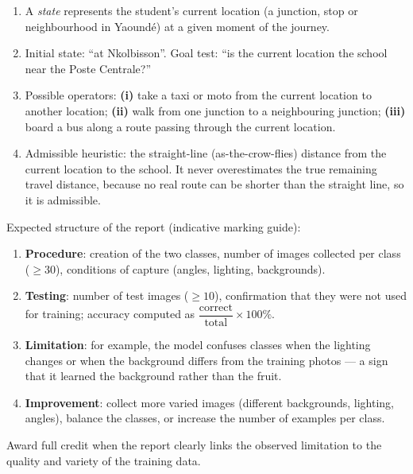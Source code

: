 \documentclass[11pt]{article}
\begin{document}
\begin{corrige}
\begin{enumerate}
\item A \emph{state} represents the student's current location (a junction, stop or neighbourhood in Yaoundé) at a given moment of the journey.
\item Initial state: ``at Nkolbisson''. Goal test: ``is the current location the school near the Poste Centrale?''
\item Possible operators: \textbf{(i)} take a taxi or moto from the current location to another location; \textbf{(ii)} walk from one junction to a neighbouring junction; \textbf{(iii)} board a bus along a route passing through the current location.
\item Admissible heuristic: the straight-line (as-the-crow-flies) distance from the current location to the school. It never overestimates the true remaining travel distance, because no real route can be shorter than the straight line, so it is admissible.
\end{enumerate}
\end{corrige}

\begin{corrige}
Expected structure of the report (indicative marking guide):
\begin{enumerate}
\item \textbf{Procedure}: creation of the two classes, number of images collected per class ($\geq 30$), conditions of capture (angles, lighting, backgrounds).
\item \textbf{Testing}: number of test images ($\geq 10$), confirmation that they were not used for training; accuracy computed as $\dfrac{\text{correct}}{\text{total}} \times 100\%$.
\item \textbf{Limitation}: for example, the model confuses classes when the lighting changes or when the background differs from the training photos --- a sign that it learned the background rather than the fruit.
\item \textbf{Improvement}: collect more varied images (different backgrounds, lighting, angles), balance the classes, or increase the number of examples per class.
\end{enumerate}
Award full credit when the report clearly links the observed limitation to the quality and variety of the training data.
\end{corrige}
\end{document}
